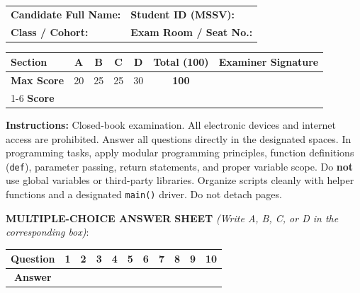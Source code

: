 \documentclass[11pt,a4paper]{article}
\begin{document}
\begin{headerbox}
\begin{tabular*}{\textwidth}{@{\extracolsep{\fill}}ll@{}}
  \textbf{Candidate Full Name:} \dotfill & \textbf{Student ID (MSSV):} \dotfill \\[0.15em]
  \textbf{Class / Cohort:} \dotfill & \textbf{Exam Room / Seat No.:} \dotfill
\end{tabular*}

\vspace{0.15em}
\renewcommand{\arraystretch}{1.0}
\setlength{\tabcolsep}{4.5pt}
\centering
\begin{tabular}{|l|c|c|c|c||c|c|}
\hline
\textbf{Section} & \textbf{A} & \textbf{B} & \textbf{C} & \textbf{D} & \textbf{Total (100)} & \textbf{Examiner Signature} \\
\hline
\textbf{Max Score} & 20 & 25 & 25 & 30 & \textbf{100} & \\[0.25em]
\cline{1-6}
\textbf{Score} & & & & & & \\[0.35em]
\hline
\end{tabular}

\vspace{0.1em}
\raggedright
\scriptsize
\textbf{Instructions:} Closed-book examination. All electronic devices and internet access are prohibited. Answer all questions directly in the designated spaces. In programming tasks, apply modular programming principles, function definitions (\texttt{def}), parameter passing, return statements, and proper variable scope. Do \textbf{not} use global variables or third-party libraries. Organize scripts cleanly with helper functions and a designated \texttt{main()} driver. Do not detach pages.
\end{headerbox}

\vspace{0.5mm}
\noindent
\textbf{MULTIPLE-CHOICE ANSWER SHEET} \textit{(Write A, B, C, or D in the corresponding box)}:
\begin{center}
\setlength{\tabcolsep}{5pt}
\renewcommand{\arraystretch}{1.0}
\begin{tabular}{|c|c|c|c|c|c|c|c|c|c|c|}
\hline
\textbf{Question} & \textbf{1} & \textbf{2} & \textbf{3} & \textbf{4} & \textbf{5} & \textbf{6} & \textbf{7} & \textbf{8} & \textbf{9} & \textbf{10} \\
\hline
\textbf{Answer} & & & & & & & & & & \\[1.5mm]
\hline
\end{tabular}
\end{center}
\vspace{-3mm}
\end{document}

